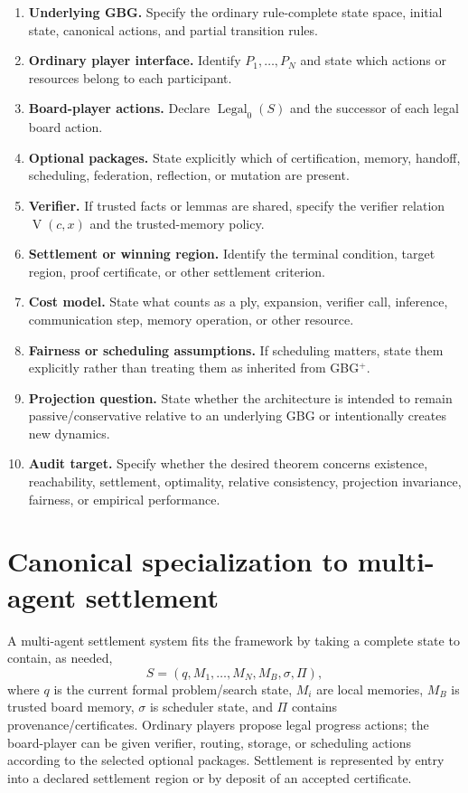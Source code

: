 \documentclass[11pt]{article}
\theoremstyle{definition}
\theoremstyle{remark}
\newcommand{\Legal}{\operatorname{Legal}}
\newcommand{\V}{\operatorname{V}}
\begin{document}
\begin{enumerate}[leftmargin=1.6em]
\item \textbf{Underlying GBG.}  Specify the ordinary rule-complete state space, initial state, canonical actions, and partial transition rules.
\item \textbf{Ordinary player interface.}  Identify $P_1,\ldots,P_N$ and state which actions or resources belong to each participant.
\item \textbf{Board-player actions.}  Declare $\Legal_0(S)$ and the successor of each legal board action.
\item \textbf{Optional packages.}  State explicitly which of certification, memory, handoff, scheduling, federation, reflection, or mutation are present.
\item \textbf{Verifier.}  If trusted facts or lemmas are shared, specify the verifier relation $\V(c,x)$ and the trusted-memory policy.
\item \textbf{Settlement or winning region.}  Identify the terminal condition, target region, proof certificate, or other settlement criterion.
\item \textbf{Cost model.}  State what counts as a ply, expansion, verifier call, inference, communication step, memory operation, or other resource.
\item \textbf{Fairness or scheduling assumptions.}  If scheduling matters, state them explicitly rather than treating them as inherited from GBG$^{+}$.
\item \textbf{Projection question.}  State whether the architecture is intended to remain passive/conservative relative to an underlying GBG or intentionally creates new dynamics.
\item \textbf{Audit target.}  Specify whether the desired theorem concerns existence, reachability, settlement, optimality, relative consistency, projection invariance, fairness, or empirical performance.
\end{enumerate}

\section{Canonical specialization to multi-agent settlement}

A multi-agent settlement system fits the framework by taking a complete state to contain, as needed,
\[
S=(q,M_1,\ldots,M_N,M_B,\sigma,\Pi),
\]
where $q$ is the current formal problem/search state, $M_i$ are local memories, $M_B$ is trusted board memory, $\sigma$ is scheduler state, and $\Pi$ contains provenance/certificates.  Ordinary players propose legal progress actions; the board-player can be given verifier, routing, storage, or scheduling actions according to the selected optional packages.  Settlement is represented by entry into a declared settlement region or by deposit of an accepted certificate.
\end{document}
